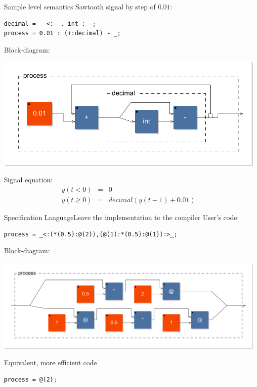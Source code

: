 \begin{frame}[fragile]{Sample level semantics}
Sawtooth signal by step of $0.01$:
\begin{lstlisting}
decimal = _ <: _, int : -;
process = 0.01 : (+:decimal) ~ _;
\end{lstlisting}

Block-diagram:
\begin{center}
    \includegraphics[scale=0.4]{images/sawtooth-diag}
\end{center}

Signal equation:
\begin{eqnarray*}
    y(t<0) & = & 0\\
    y(t\geq 0) & = & decimal(y(t-1) + 0.01)
\end{eqnarray*}

\end{frame}



\begin{frame}[fragile]{Specification Language}{Leave the implementation to the compiler}
User's code:
\begin{lstlisting}
process = _<:(*(0.5):@(2)),(@(1):*(0.5):@(1)):>_;
\end{lstlisting}

Block-diagram:
\begin{center}
    \includegraphics[scale=0.4]{images/equiv1-diag}
\end{center}

Equivalent, more efficient code
\begin{lstlisting}
process = @(2);
\end{lstlisting}

\end{frame}



